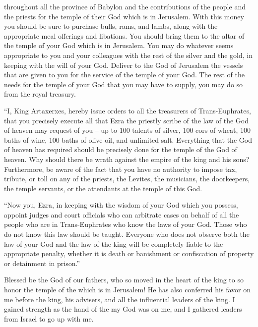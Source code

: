 {throughout all
the province
of Babylon
and
the contributions
of the people
and the priests
for the temple
of their God
which
is in Jerusalem.
With
this
money
you should be sure
to purchase
bulls,
rams,
and lambs,
along with the appropriate meal offerings
and libations.
You should bring
them
to
the altar
of the temple
of your God
which
is in Jerusalem.
You may do
whatever
seems appropriate
to
you and your colleagues
with the rest of
the silver
and the gold,
in keeping
with the will
of your God.
Deliver
to
the God
of Jerusalem
the vessels
that
are given to
you for the service
of the temple
of your God.
The rest of
the needs
for the temple
of your God
that
you may have to supply,
you may do so
from
the royal
treasury.
\par }{\PP {}“I,
King
Artaxerxes,
hereby
issue
orders
to all
the treasurers
of Trans-Euphrates,
that
you precisely
execute
all
that
Ezra
the priestly
scribe
of the law
of the God
of heaven
may request of you –
up to
100
talents
of silver,
100
cors
of wheat,
100
baths
of wine,
100
baths
of olive oil,
and unlimited
salt.
Everything
that
the God
of heaven
has required
should be precisely
done
for the temple
of the God
of heaven.
Why
should there be
wrath
against
the empire
of the king
and his sons?
Furthermore, be aware
of the fact that
you have no
authority
to impose
tax,
tribute,
or toll
on
any
of the priests,
the Levites,
the musicians,
the doorkeepers,
the temple servants,
or the attendants
at the temple
of this
God.
\par }{\PP {}“Now you,
Ezra,
in keeping with the wisdom
of your God
which
you possess,
appoint
judges
and court officials
who
can
arbitrate cases
on behalf of all
the people
who
are in Trans-Euphrates
who know
the laws
of your God.
Those who
do not
know
this law should be taught.
Everyone
who
does
not
observe
both the law
of your God
and the law
of the king
will be completely liable
to the appropriate
penalty,
whether
it is death
or
banishment
or
confiscation
of property
or detainment in prison.”
\par }{\PP Blessed
be the
{}
God
of our fathers,
who
so
moved
in the heart
of the king
to so honor
the
temple
of the {}
which
is in Jerusalem!
He
has also conferred
his favor
on
me before
the king,
his advisers,
and all
the influential
leaders
of the king.
I
gained
strength
as the hand
of the {}
my God
was on
me, and I gathered
leaders
from Israel
to go up
with me.

}
